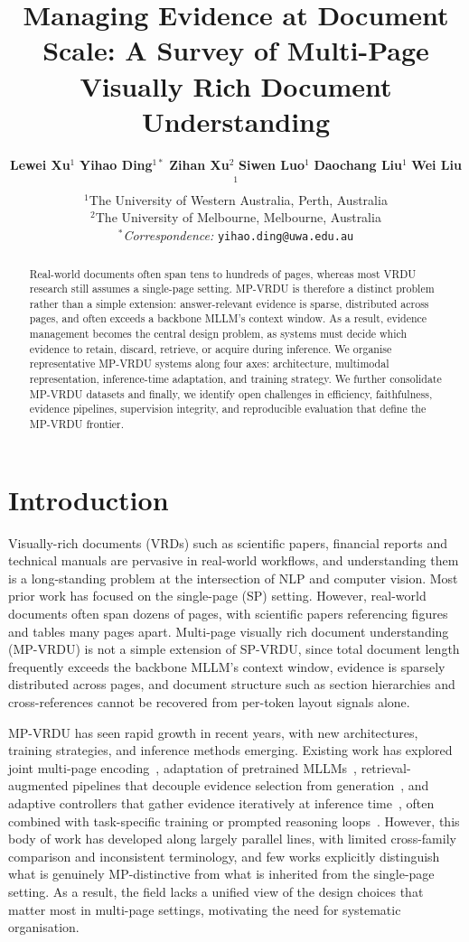 \documentclass[11pt]{article}
\title{Managing Evidence at Document Scale: A Survey of Multi-Page Visually Rich Document Understanding}
\author{
  \textbf{Lewei Xu}$^{1}$ \quad \textbf{Yihao Ding}$^{1*}$ \quad \textbf{Zihan Xu}$^2$ \quad
  \textbf{Siwen Luo}$^1$ \quad \textbf{Daochang Liu}$^1$ \quad \textbf{Wei Liu}$^1$ \\[4pt]
  $^1$The University of Western Australia, Perth, Australia \\[2pt]
  $^2$The University of Melbourne, Melbourne, Australia \\[2pt]
  $^*$\textit{Correspondence:}
  \texttt{yihao.ding@uwa.edu.au}
}
\begin{document}
\maketitle
\begin{abstract}
Real-world documents often span tens to hundreds of pages, whereas most VRDU research still assumes a single-page setting. MP-VRDU is therefore a distinct problem rather than a simple extension: answer-relevant evidence is sparse, distributed across pages, and often exceeds a backbone MLLM's context window. As a result, evidence management becomes the central design problem, as systems must decide which evidence to retain, discard, retrieve, or acquire during inference. We organise representative MP-VRDU systems along four axes: architecture, multimodal representation, inference-time adaptation, and training strategy. We further consolidate MP-VRDU datasets and finally, we identify open challenges in efficiency, faithfulness, evidence pipelines, supervision integrity, and reproducible evaluation that define the MP-VRDU frontier.
\end{abstract}



\section{Introduction}
Visually-rich documents (VRDs) such as scientific papers, financial reports and technical manuals are pervasive in real-world workflows, and understanding them is a long-standing problem at the intersection of NLP and computer vision. Most prior work has focused on the single-page (SP) setting. However, real-world documents often span dozens of pages, with scientific papers referencing figures and tables many pages apart. Multi-page visually rich document understanding (MP-VRDU) is not a simple extension of SP-VRDU, since total document length frequently exceeds the backbone MLLM's context window, evidence is sparsely distributed across pages, and document structure such as section hierarchies and cross-references cannot be recovered from per-token layout signals alone.

MP-VRDU has seen rapid growth in recent years, with new architectures, training strategies, and inference methods emerging. Existing work has explored joint multi-page encoding~\cite{tito2023hierarchical}, adaptation of pretrained MLLMs~\cite{duan2025docopilot}, retrieval-augmented pipelines that decouple evidence selection from generation~\cite{cho2024m3docrag}, and adaptive controllers that gather evidence iteratively at inference time~\cite{sun2025docagent}, often combined with task-specific training or prompted reasoning loops~\cite{xiong2026docr1, han2025mdocagent}. However, this body of work has developed along largely parallel lines, with limited cross-family comparison and inconsistent terminology, and few works explicitly distinguish what is genuinely MP-distinctive from what is inherited from the single-page setting. As a result, the field lacks a unified view of the design choices that matter most in multi-page settings, motivating the need for systematic organisation.
\end{document}
